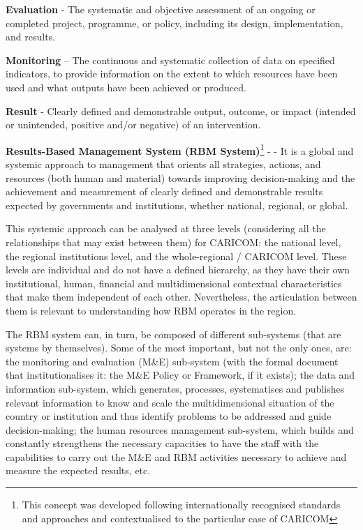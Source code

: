 \documentclass[
  10pt,
]{book}
\begin{document}
\textbf{Evaluation} - The systematic and objective assessment of an ongoing or completed project, programme, or policy, including its design, implementation, and results.

\textbf{Monitoring} -- The continuous and systematic collection of data on specified indicators, to provide information on the extent to which resources have been used and what outputs have been achieved or produced.

\textbf{Result} - Clearly defined and demonstrable output, outcome, or impact (intended or unintended, positive and/or negative) of an intervention.

\textbf{Results-Based Management System (RBM System)}\footnote{This concept was developed following internationally recognised standards and approaches and contextualised to the particular case of CARICOM} - - It is a global and systemic approach to management that orients all strategies, actions, and resources (both human and material) towards improving decision-making and the achievement and measurement of clearly defined and demonstrable results expected by governments and institutions, whether national, regional, or global.

This systemic approach can be analysed at three levels (considering all the relationships that may exist between them) for CARICOM: the national level, the regional institutions level, and the whole-regional / CARICOM level. These levels are individual and do not have a defined hierarchy, as they have their own institutional, human, financial and multidimensional contextual characteristics that make them independent of each other. Nevertheless, the articulation between them is relevant to understanding how RBM operates in the region.

The RBM system can, in turn, be composed of different sub-systems (that are systems by themselves). Some of the most important, but not the only ones, are: the monitoring and evaluation (M\&E) sub-system (with the formal document that institutionalises it: the M\&E Policy or Framework, if it exists); the data and information sub-system, which generates, processes, systematises and publishes relevant information to know and scale the multidimensional situation of the country or institution and thus identify problems to be addressed and guide decision-making; the human resources management sub-system, which builds and constantly strengthens the necessary capacities to have the staff with the capabilities to carry out the M\&E and RBM activities necessary to achieve and measure the expected results, etc.
\end{document}
